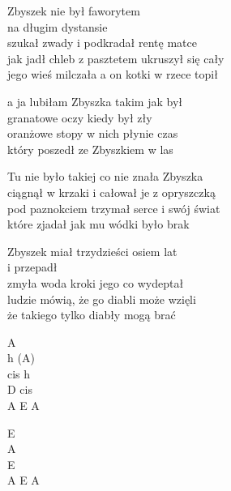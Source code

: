 \begin{text}
    Zbyszek nie był faworytem\\
    na długim dystansie\\
    szukał zwady i podkradał rentę matce\\
    jak jadł chleb z pasztetem ukruszył się cały\\
    jego wieś milczała a on kotki w rzece topił

    \vin a ja lubiłam Zbyszka takim jak był\\
    \vin granatowe oczy kiedy był zły\\
    \vin oranżowe stopy w nich płynie czas\\
    \vin który poszedł ze Zbyszkiem w las

    Tu nie było takiej co nie znała Zbyszka\\
    ciągnął w krzaki i całował je z opryszczką\\
    pod paznokciem trzymał serce i swój świat\\
    które zjadał jak mu wódki było brak

    Zbyszek miał trzydzieści osiem lat\\
    i przepadł\\
    zmyła woda kroki jego co wydeptał\\
    ludzie mówią, że go diabli może wzięli\\
    że takiego tylko diabły mogą brać
\end{text}
\begin{chord}
    A\\
    h (A)\\
    cis h\\
    D cis\\
    A E A

    E\\
    A\\
    E\\
    A E A
\end{chord}